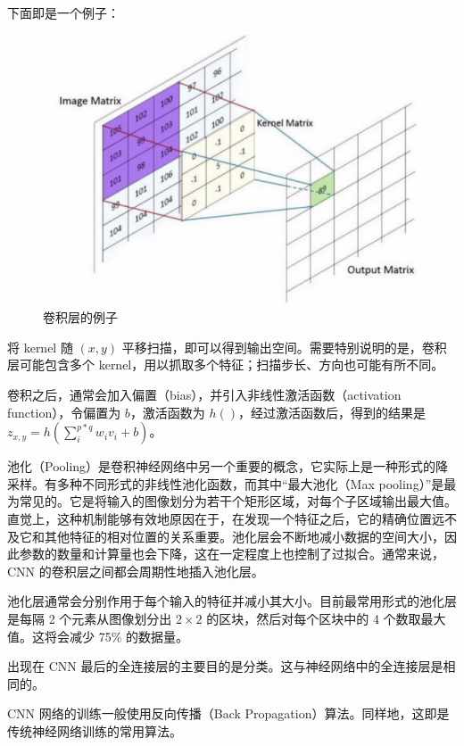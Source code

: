 下面即是一个例子：

\begin{figure}[ht]
    \centering
    \includegraphics[width=\linewidth]{figures/cnn_conv}
    \caption{卷积层的例子}
    \label{fig:cnn_conv}
\end{figure}

将 kernel 随 ${\displaystyle (x,y)}$ 平移扫描，即可以得到输出空间。需要特别说明的是，卷积层可能包含多个 kernel，用以抓取多个特征；扫描步长、方向也可能有所不同。

卷积之后，通常会加入偏置（bias），并引入非线性激活函数（activation function），令偏置为 ${\displaystyle b}$，激活函数为 ${\displaystyle h\left(\right)}$，经过激活函数后，得到的结果是 ${\displaystyle z_{x,y}=h\left(\sum_i^{p*q} w_i v_i +b\right)}$。

池化（Pooling）是卷积神经网络中另一个重要的概念，它实际上是一种形式的降采样。有多种不同形式的非线性池化函数，而其中“最大池化（Max pooling）”是最为常见的。它是将输入的图像划分为若干个矩形区域，对每个子区域输出最大值。直觉上，这种机制能够有效地原因在于，在发现一个特征之后，它的精确位置远不及它和其他特征的相对位置的关系重要。池化层会不断地减小数据的空间大小，因此参数的数量和计算量也会下降，这在一定程度上也控制了过拟合。通常来说，CNN 的卷积层之间都会周期性地插入池化层。

池化层通常会分别作用于每个输入的特征并减小其大小。目前最常用形式的池化层是每隔 2 个元素从图像划分出 ${\displaystyle 2\times 2}$ 的区块，然后对每个区块中的 4 个数取最大值。这将会减少 75\% 的数据量。

出现在 CNN 最后的全连接层的主要目的是分类。这与神经网络中的全连接层是相同的。

CNN 网络的训练一般使用反向传播（Back Propagation）算法。同样地，这即是传统神经网络训练的常用算法。


